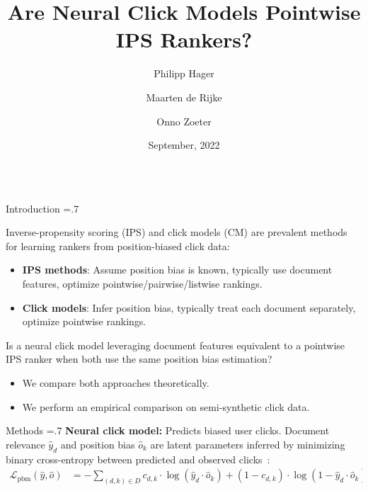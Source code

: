 \documentclass[final]{beamer}
\title{\huge Are Neural Click Models Pointwise IPS Rankers?}
\author{Philipp Hager\inst{1} \and Maarten de Rijke\inst{1} \and Onno Zoeter\inst{2}}
\institute[shortinst]{\inst{1} University of Amsterdam \inst{2} Booking.com}
\date[Sep. 2022]{September, 2022}
\newlength{\onecolwid}
\begin{document}
\begin{frame}[t]
	\begin{columns}[t]
    \begin{column}{\onecolwid}
    \begin{block}{Introduction}
	\baselineskip=.7\baselineskip

		Inverse-propensity scoring (IPS) and click models (CM) are prevalent methods for learning rankers from position-biased click data:
		\vspace{1ex}
		\begin{itemize}
			\item {\bf IPS methods}: Assume position bias is known, typically use document features, optimize pointwise/pairwise/listwise rankings.
			\item {\bf Click models}: Infer position bias, typically treat each document separately, optimize pointwise rankings.
		\end{itemize}
		
		\vspace{1ex}
		
		Is a neural click model leveraging document features equivalent to a pointwise IPS ranker when both use the same position bias estimation?
		
		\vspace{1ex}
		
		\begin{itemize}
			\item We compare both approaches theoretically.
			\item We perform an empirical comparison on semi-synthetic click data.
		\end{itemize}

	\end{block}

	\vspace{2ex}

	\begin{block}{Methods}
		\baselineskip=.7\baselineskip
		\textbf{Neural click model:} Predicts biased user clicks. Document relevance $\hat{y}_d$ and position bias $\hat{o}_k$ are latent parameters inferred by minimizing binary cross-entropy between predicted and observed clicks~\cite{Yan2022TwoTowers}:
		\vspace{1ex}
		\begin{equation*}
			\begin{split}
			\mathcal{L}_{\text{pbm}}(\hat{y}, \hat{o}) &= - \sum_{(d, k) \in D} c_{d,k} \cdot \log(\hat{y}_{d} \cdot \hat{o}_{k}) + (1 - c_{d,k}) \cdot \log(1 - \hat{y}_{d} \cdot \hat{o}_{k}).
			\end{split}
		\end{equation*}


\end{block}
\end{column}
\end{columns}
\end{frame}
\end{document}
